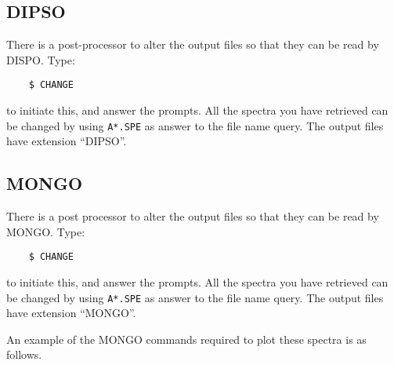\subsection{DIPSO}
There is a post-processor to alter the output files so that they can be 
read by DISPO. Type:
\begin{verbatim}
    $ CHANGE
\end{verbatim}
to initiate this, and answer the prompts. 
All the spectra you have retrieved can be changed by using {\tt A*.SPE} as 
answer to the file name query.
The output files have extension ``DIPSO''.

\subsection{MONGO}
There is a post processor to alter the output files so that they can be 
read by MONGO. Type:
\begin{verbatim}
    $ CHANGE
\end{verbatim}
to initiate this, and answer the prompts. 
All the spectra you have retrieved can be changed by using {\tt A*.SPE} as 
answer to the file name query.
The output files have extension ``MONGO''.

An example of the MONGO commands required to plot these spectra is as follows.


